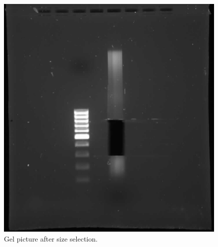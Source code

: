 \begin{figure}[!htb]
\begin{center}
\includegraphics[scale=0.3]{GelSizeSelection_071011}
\caption{Gel picture after size selection.}
\label{SizeSel}
\end{center}
\end{figure}


